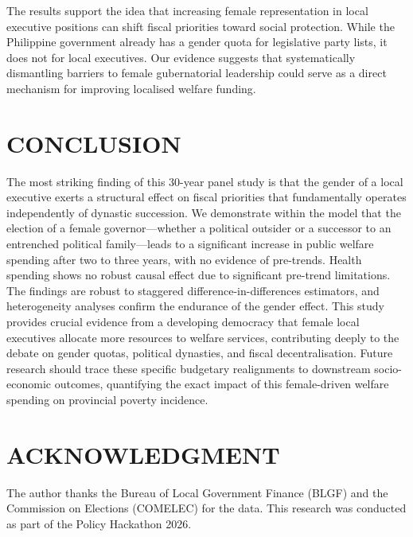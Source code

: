 \documentclass[conference]{IEEEtran}
\begin{document}
The results support the idea that increasing female representation in local executive positions can shift fiscal priorities toward social protection. While the Philippine government already has a gender quota for legislative party lists, it does not for local executives. Our evidence suggests that systematically dismantling barriers to female gubernatorial leadership could serve as a direct mechanism for improving localised welfare funding.

\section{CONCLUSION}

The most striking finding of this 30-year panel study is that the gender of a local executive exerts a structural effect on fiscal priorities that fundamentally operates independently of dynastic succession. We demonstrate within the model that the election of a female governor---whether a political outsider or a successor to an entrenched political family---leads to a significant increase in public welfare spending after two to three years, with no evidence of pre-trends. Health spending shows no robust causal effect due to significant pre-trend limitations. The findings are robust to staggered difference-in-differences estimators, and heterogeneity analyses confirm the endurance of the gender effect. This study provides crucial evidence from a developing democracy that female local executives allocate more resources to welfare services, contributing deeply to the debate on gender quotas, political dynasties, and fiscal decentralisation. Future research should trace these specific budgetary realignments to downstream socio-economic outcomes, quantifying the exact impact of this female-driven welfare spending on provincial poverty incidence.

\section*{ACKNOWLEDGMENT}
The author thanks the Bureau of Local Government Finance (BLGF) and the Commission on Elections (COMELEC) for the data. This research was conducted as part of the Policy Hackathon 2026.
\end{document}

